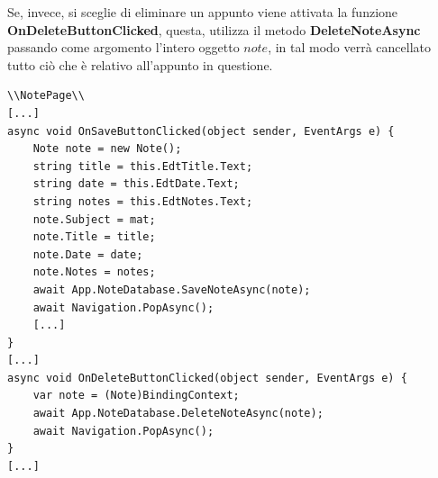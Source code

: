 \documentclass[a4paper, 50pt, twoside]{article}
\begin{document}
Se, invece, si sceglie di eliminare un appunto viene attivata la funzione \textbf{OnDeleteButtonClicked}, questa, utilizza il metodo \textbf{DeleteNoteAsync} passando come argomento l'intero oggetto $note$, in tal modo verrà cancellato tutto ciò che è relativo all'appunto in questione.

\begin{lstlisting}
\\NotePage\\
[...]
async void OnSaveButtonClicked(object sender, EventArgs e) {
	Note note = new Note();
	string title = this.EdtTitle.Text;
	string date = this.EdtDate.Text;
	string notes = this.EdtNotes.Text;
	note.Subject = mat;
	note.Title = title;
	note.Date = date;
	note.Notes = notes;
	await App.NoteDatabase.SaveNoteAsync(note);
	await Navigation.PopAsync();
	[...]
}
[...]
async void OnDeleteButtonClicked(object sender, EventArgs e) {
	var note = (Note)BindingContext;
	await App.NoteDatabase.DeleteNoteAsync(note);
	await Navigation.PopAsync();
}
[...]
\end{lstlisting}
\end{document}
